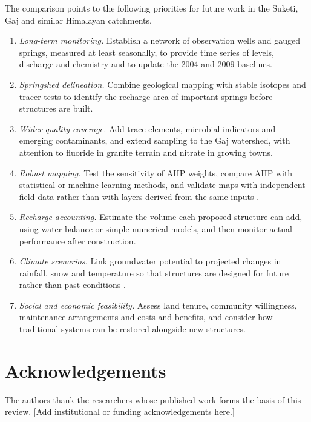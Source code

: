\documentclass[10pt,a4paper,twocolumn]{article}
\begin{document}
The comparison points to the following priorities for future work in the Suketi, Gaj and
similar Himalayan catchments.
\begin{enumerate}
  \item \textit{Long-term monitoring.} Establish a network of observation wells and gauged
        springs, measured at least seasonally, to provide time series of levels, discharge and
        chemistry and to update the 2004 and 2009 baselines.
  \item \textit{Springshed delineation.} Combine geological mapping with stable isotopes and
        tracer tests to identify the recharge area of important springs before structures are
        built.
  \item \textit{Wider quality coverage.} Add trace elements, microbial indicators and emerging
        contaminants, and extend sampling to the Gaj watershed, with attention to fluoride in
        granite terrain and nitrate in growing towns.
  \item \textit{Robust mapping.} Test the sensitivity of AHP weights, compare AHP with
        statistical or machine-learning methods, and validate maps with independent field data
        rather than with layers derived from the same inputs \citep{machiwal2011}.
  \item \textit{Recharge accounting.} Estimate the volume each proposed structure can add,
        using water-balance or simple numerical models, and then monitor actual performance
        after construction.
  \item \textit{Climate scenarios.} Link groundwater potential to projected changes in rainfall,
        snow and temperature so that structures are designed for future rather than past
        conditions \citep{immerzeel2010}.
  \item \textit{Social and economic feasibility.} Assess land tenure, community willingness,
        maintenance arrangements and costs and benefits, and consider how traditional systems
        can be restored alongside new structures.
\end{enumerate}

\section{Acknowledgements}
The authors thank the researchers whose published work forms the basis of this review.
[Add institutional or funding acknowledgements here.]
\end{document}

